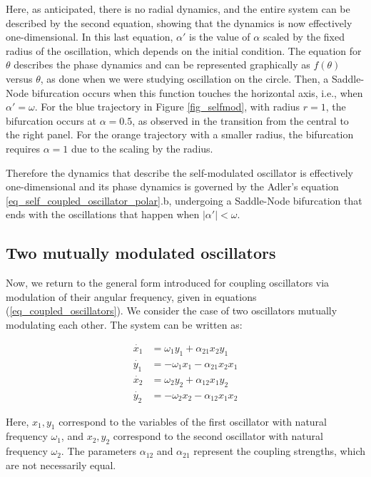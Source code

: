 \documentclass{article}
\begin{document}
Here, as anticipated, there is no radial dynamics, and the entire system can be described by the second equation, showing that the dynamics is now effectively one-dimensional.
In this last equation, $\alpha'$ is the value of $\alpha$ scaled by the fixed radius of the oscillation, which depends on the initial condition. 
The equation for $\theta$ describes the phase dynamics and can be represented graphically as $f(\theta)$ versus $\theta$, as done when we were studying oscillation on the circle. 
Then, a Saddle-Node bifurcation occurs when this function touches the horizontal axis, i.e., when $\alpha' = \omega$. For the blue trajectory in Figure \ref{fig_selfmod}, with radius $r = 1$, the bifurcation occurs at $\alpha = 0.5$, as observed in the transition from the central to the right panel. For the orange trajectory with a smaller radius, the bifurcation requires $\alpha = 1$ due to the scaling by the radius.

Therefore the dynamics that describe the self-modulated oscillator is effectively one-dimensional and its phase dynamics is governed by the Adler's equation \ref{eq_self_coupled_oscillator_polar}.b, undergoing a Saddle-Node bifurcation that ends with the oscillations that happen when $|\alpha'|<\omega$.


\subsection{Two mutually modulated oscillators}

Now, we return to the general form introduced for coupling oscillators via modulation of their angular frequency, given in equations (\ref{eq_coupled_oscillators}). 
We consider the case of two oscillators mutually modulating each other. The system can be written as:


\begin{subequations} \label{eq_twomodulated}
\begin{align}
    \dot{x_1} & = \omega_1 y_1+ \alpha_{21} x_2 y_1 \\
    \dot{y_1} & = -\omega_1 x_1 - \alpha_{21} x_2 x_1 \\
    \dot{x_2} & = \omega_2 y_2+ \alpha_{12} x_1 y_2 \\
    \dot{y_2} & = -\omega_2 x_2 - \alpha_{12} x_1 x_2 
\end{align}
\end{subequations}

Here, $x_1, y_1$ correspond to the variables of the first oscillator with natural frequency $\omega_1$, and $x_2, y_2$ correspond to the second oscillator with natural frequency $\omega_2$. The parameters $\alpha_{12}$ and $\alpha_{21}$ represent the coupling strengths, which are not necessarily equal.
\end{document}
